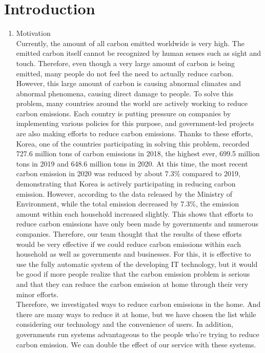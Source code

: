 \documentclass[11pt, conference]{IEEEtran}
\begin{document}
\section{\Large{Introduction}}
\begin{enumerate}[label=\arabic*]
    \item {\large{Motivation}} \\
    Currently, the amount of all carbon emitted worldwide is very high. The emitted carbon itself cannot be recognized by human senses such as sight and touch. Therefore, even though a very large amount of carbon is being emitted, many people do not feel the need to actually reduce carbon. However, this large amount of carbon is causing abnormal climates and abnormal phenomena, causing direct damage to people. To solve this problem, many countries around the world are actively working to reduce carbon emissions. Each country is putting pressure on companies by implementing various policies for this purpose, and government-led projects are also making efforts to reduce carbon emissions. Thanks to these efforts, Korea, one of the countries participating in solving this problem, recorded 727.6 million tons of carbon emissions in 2018, the highest ever, 699.5 million tons in 2019 and 648.6 million tons in 2020. At this time, the most recent carbon emission in 2020 was reduced by about 7.3\% compared to 2019, demonstrating that Korea is actively participating in reducing carbon emission. However, according to the data released by the Ministry of Environment, while the total emission decreased by 7.3\%, the emission amount within each household increased slightly. This shows that efforts to reduce carbon emissions have only been made by governments and numerous companies. Therefore, our team thought that the results of these efforts would be very effective if we could reduce carbon emissions within each household as well as governments and businesses. For this, it is effective to use the fully automatic system of the developing IT technology, but it would be good if more people realize that the carbon emission problem is serious and that they can reduce the carbon emission at home through their very minor efforts.\\
    Therefore, we investigated ways to reduce carbon emissions in the home. And there are many ways to reduce it at home, but we have chosen the list while considering our technology and the convenience of users. In addition, governments run systems advantageous to the people who're trying to reduce carbon emission. We can double the effect of our service with these systems.

\end{enumerate}
\end{document}
